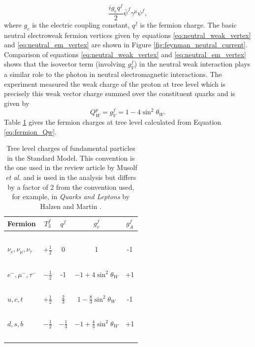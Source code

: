 \begin{equation}
 \frac{ig_eq^f}{2}\bar{\psi}^f\gamma^{\mu}\psi^f,
\label{eq:neutral_em_vertex}
\end{equation}
where $g_e$ is the electric coupling constant, $q^f$ is the fermion charge. The basic neutral electroweak fermion vertices given by equations \ref{eq:neutral_weak_vertex} and \ref{eq:neutral_em_vertex} are shown in Figure \ref{fig:feynman_neutral_current}. Comparison of equations \ref{eq:neutral_weak_vertex} and \ref{eq:neutral_em_vertex} shows that the isovector term (involving $g_V^f$) in the neutral weak interaction plays a similar role to the photon in neutral electromagnetic interactions. The \Qs experiment measured the weak charge of the proton at tree level which is precisely this weak vector charge summed over the constituent quarks and is given by 
\begin{equation}
Q_W^p=g_V^f=1-4\sin^2\theta_W.
\label{eq:Qwp}
\end{equation}
Table \ref{tab:fermion_charges} gives the fermion charges at tree level calculated from Equation \ref{eq:fermion_Qw}.
\begin{table}[h]
\caption{Tree level charges of fundamental particles in the Standard Model. This convention is the one used in the review article by Musolf {\it et al.}\cite{Musolf1994} and is used in the \Qs analysis but differs by a factor of 2 from the convention used, for example, in {\it Quarks and Leptons} by Halzen and Martin \cite{Halzen}.}
\begin{center}
\begin{tabular}{l|c|c|c|c}
Fermion&$T_3^f$&$q^f$&$g_v^f$&$g_A^f$\\\hline
~&~&~&~&~\\
$\nu_e,\nu_{\mu},\nu_{\tau}$&$+\frac{1}{2}$&0&1&-1\\
~&~&~&~&~\\
$e^-,\mu^-,\tau^-$&$-\frac{1}{2}$&-1&$-1+4\sin^2\theta_W$&+1\\
~&~&~&~&~\\
$u, c, t$&$+\frac{1}{2}$&$\frac{2}{3}$&$1-\frac{8}{3}\sin^2\theta_W$&-1\\
~&~&~&~&~\\
$d, s, b$&$-\frac{1}{2}$&$-\frac{1}{3}$&$-1+\frac{4}{3}\sin^2\theta_W$&+1\\
~&~&~&~&~\\
\hline
\end{tabular}
\end{center}
\label{tab:fermion_charges}
\end{table}
\\

